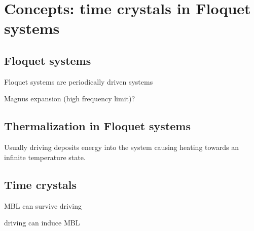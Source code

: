 \chapter{Concepts: time crystals in Floquet systems}\label{ch:introduction-floquet}



\section{Floquet systems}

Floquet systems are periodically driven systems

Magnus expansion (high frequency limit)?

\section{Thermalization in Floquet systems}

Usually driving deposits energy into the system causing heating towards an infinite temperature state.

\section{Time crystals}

MBL can survive driving \cite{abaninTheoryManybodyLocalization2016}

driving can induce MBL \cite{choiDynamicallyInducedManybody2018}